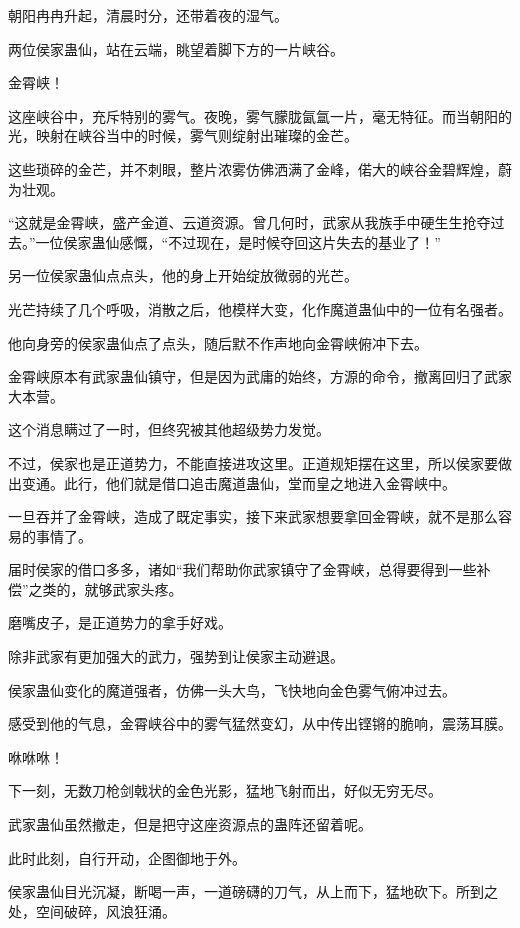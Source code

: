 
\begin{this_body}

朝阳冉冉升起，清晨时分，还带着夜的湿气。

两位侯家蛊仙，站在云端，眺望着脚下方的一片峡谷。

金霄峡！

这座峡谷中，充斥特别的雾气。夜晚，雾气朦胧氤氲一片，毫无特征。而当朝阳的光，映射在峡谷当中的时候，雾气则绽射出璀璨的金芒。

这些琐碎的金芒，并不刺眼，整片浓雾仿佛洒满了金峰，偌大的峡谷金碧辉煌，蔚为壮观。

“这就是金霄峡，盛产金道、云道资源。曾几何时，武家从我族手中硬生生抢夺过去。”一位侯家蛊仙感慨，“不过现在，是时候夺回这片失去的基业了！”

另一位侯家蛊仙点点头，他的身上开始绽放微弱的光芒。

光芒持续了几个呼吸，消散之后，他模样大变，化作魔道蛊仙中的一位有名强者。

他向身旁的侯家蛊仙点了点头，随后默不作声地向金霄峡俯冲下去。

金霄峡原本有武家蛊仙镇守，但是因为武庸的始终，方源的命令，撤离回归了武家大本营。

这个消息瞒过了一时，但终究被其他超级势力发觉。

不过，侯家也是正道势力，不能直接进攻这里。正道规矩摆在这里，所以侯家要做出变通。此行，他们就是借口追击魔道蛊仙，堂而皇之地进入金霄峡中。

一旦吞并了金霄峡，造成了既定事实，接下来武家想要拿回金霄峡，就不是那么容易的事情了。

届时侯家的借口多多，诸如“我们帮助你武家镇守了金霄峡，总得要得到一些补偿”之类的，就够武家头疼。

磨嘴皮子，是正道势力的拿手好戏。

除非武家有更加强大的武力，强势到让侯家主动避退。

侯家蛊仙变化的魔道强者，仿佛一头大鸟，飞快地向金色雾气俯冲过去。

感受到他的气息，金霄峡谷中的雾气猛然变幻，从中传出铿锵的脆响，震荡耳膜。

咻咻咻！

下一刻，无数刀枪剑戟状的金色光影，猛地飞射而出，好似无穷无尽。

武家蛊仙虽然撤走，但是把守这座资源点的蛊阵还留着呢。

此时此刻，自行开动，企图御地于外。

侯家蛊仙目光沉凝，断喝一声，一道磅礴的刀气，从上而下，猛地砍下。所到之处，空间破碎，风浪狂涌。


\end{this_body}
